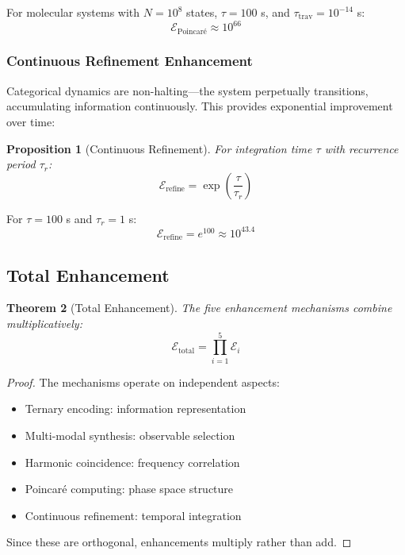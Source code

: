 \documentclass[twocolumn,10pt]{article}
\newtheorem{theorem}{Theorem}[section]
\newtheorem{proposition}[theorem]{Proposition}
\begin{document}
For molecular systems with $N = 10^8$ states, $\tau = 100$ s, and $\tau_{\text{trav}} = 10^{-14}$ s:
\begin{equation}
    \mathcal{E}_{\text{Poincar\'{e}}} \approx 10^{66}
\end{equation}

\subsubsection{Continuous Refinement Enhancement}

Categorical dynamics are non-halting---the system perpetually transitions, accumulating information continuously. This provides exponential improvement over time:

\begin{proposition}[Continuous Refinement]
\label{prop:refinement}
For integration time $\tau$ with recurrence period $\tau_r$:
\begin{equation}
    \mathcal{E}_{\text{refine}} = \exp\left(\frac{\tau}{\tau_r}\right)
\end{equation}
\end{proposition}

For $\tau = 100$ s and $\tau_r = 1$ s:
\begin{equation}
    \mathcal{E}_{\text{refine}} = e^{100} \approx 10^{43.4}
\end{equation}

\subsection{Total Enhancement}

\begin{theorem}[Total Enhancement]
\label{thm:total_enhancement}
The five enhancement mechanisms combine multiplicatively:
\begin{equation}
    \mathcal{E}_{\text{total}} = \prod_{i=1}^{5} \mathcal{E}_i
\end{equation}
\end{theorem}

\begin{proof}
The mechanisms operate on independent aspects:
\begin{itemize}
    \item Ternary encoding: information representation
    \item Multi-modal synthesis: observable selection
    \item Harmonic coincidence: frequency correlation
    \item Poincar\'{e} computing: phase space structure
    \item Continuous refinement: temporal integration
\end{itemize}
Since these are orthogonal, enhancements multiply rather than add.
\end{proof}
\end{document}
